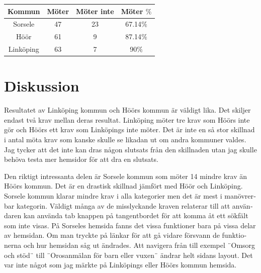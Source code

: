 \documentclass[11p]{article}
\begin{document}
\begin{otherlanguage}{swedish}
\begin{center}
    \begin{tabular}{ |c|c|c|c|}
        \hline
        Kommun & Möter & Möter inte & Möter $\%$ \\  \hline
        Sorsele & 47 & 23 & 67.14$\%$ \\ \hline
        Höör & 61 & 9 & 87.14$\%$ \\ \hline
        Linköping & 63 & 7 & 90$\%$ \\ \hline
    \end{tabular}
    \end{center}

    \section{Diskussion}
    Resultatet av Linköping kommun och Höörs kommun är väldigt lika.
    Det skiljer endast två krav mellan deras resultat.
    Linköping möter tre krav som Höörs inte gör och Höörs ett krav som Linköpings inte möter.
    Det är inte en så stor skillnad i antal möta krav som kanske skulle se likadan ut om andra kommuner valdes.
    Jag tycker att det inte kan dras någon slutsats från den skillnaden utan jag skulle behöva testa mer hemsidor för att dra en slutsats.

    Den riktigt intressanta delen är Sorsele kommun som möter 14 mindre krav än Höörs kommun.
    Det är en drastisk skillnad jämfört med Höör och Linköping.
    Sorsele kommun klarar mindre krav i alla kategorier men det är mest i manövrerbar kategorin.
    Väldigt många av de misslyckande kraven relaterar till att användaren kan använda tab knappen på tangentbordet för att komma åt ett sökfält som inte visas.
    På Sorseles hemsida fanns det vissa funktioner bara på vissa delar av hemsidan.
    Om man tryckte på länkar för att gå vidare försvann de funktionerna och hur hemsidan såg ut ändrades.
    Att navigera från till exempel ¨Omsorg och stöd¨ till ¨Orosanmälan för barn eller vuxen¨ ändrar helt sidans layout.
    Det var inte något som jag märkte på Linköpings eller Höörs kommun hemsida.



\end{otherlanguage}
\end{document}
